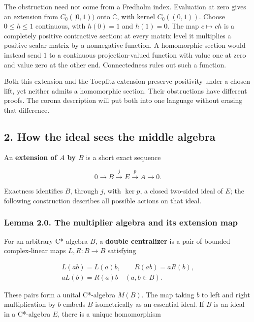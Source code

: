 \documentclass[
  11pt,
]{article}
\begin{document}
The obstruction need not come from a Fredholm index. Evaluation at zero
gives an extension from \(C_0([0,1))\) onto \(\mathbb C\), with kernel
\(C_0((0,1))\). Choose \(0\leq h\leq1\) continuous, with \(h(0)=1\) and
\(h(1)=0\). The map \(c\mapsto ch\) is a completely positive contractive
section: at every matrix level it multiplies a positive scalar matrix by
a nonnegative function. A homomorphic section would instead send \(1\)
to a continuous projection-valued function with value one at zero and
value zero at the other end. Connectedness rules out such a function.

Both this extension and the Toeplitz extension preserve positivity under
a chosen lift, yet neither admits a homomorphic section. Their
obstructions have different proofs. The corona description will put both
into one language without erasing that difference.

\subsection{2. How the ideal sees the middle
algebra}\label{how-the-ideal-sees-the-middle-algebra}

An \textbf{extension of \(A\) by \(B\)} is a short exact sequence

\[
0\longrightarrow B\overset{j}{\longrightarrow}E
\overset{p}{\longrightarrow}A\longrightarrow0.
\]

Exactness identifies \(B\), through \(j\), with \(\ker p\), a closed
two-sided ideal of \(E\); the following construction describes all
possible actions on that ideal.

\subsubsection{Lemma 2.0. The multiplier algebra and its extension
map}\label{lemma-2.0.-the-multiplier-algebra-and-its-extension-map}

For an arbitrary C*-algebra \(B\), a \textbf{double centralizer} is a
pair of bounded complex-linear maps \(L,R:B\to B\) satisfying

\[
\begin{gathered}
L(ab)=L(a)b,\qquad R(ab)=aR(b),\\
aL(b)=R(a)b\quad(a,b\in B).
\end{gathered}
\]

These pairs form a unital C*-algebra \(M(B)\). The map taking \(b\) to
left and right multiplication by \(b\) embeds \(B\) isometrically as an
essential ideal. If \(B\) is an ideal in a C*-algebra \(E\), there is a
unique homomorphism
\end{document}
